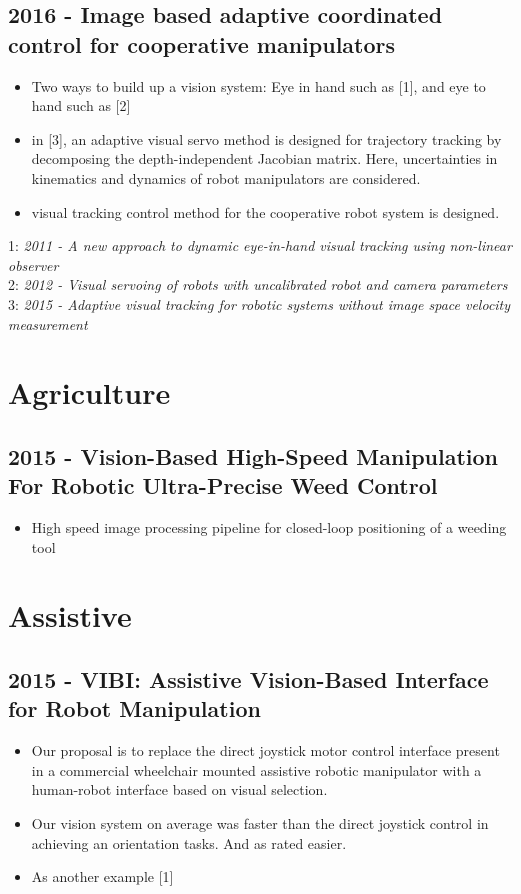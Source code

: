 \subsection{2016 - Image based adaptive coordinated control for cooperative manipulators}
\begin{itemize}
\item Two ways to build up a vision system: Eye in hand such as [1], and eye to hand such as [2]
\item in [3], an adaptive visual servo method is designed for trajectory tracking by decomposing the depth-independent Jacobian matrix. Here, uncertainties in kinematics and dynamics of robot manipulators are considered. 
\item visual tracking control method for the cooperative robot system is designed. 
\end{itemize}
1: \textit{2011 - A new approach to dynamic eye-in-hand visual tracking using non-linear observer} \\
2: \textit{2012 - Visual servoing of robots with uncalibrated robot and camera parameters} \\
3: \textit{2015 - Adaptive visual tracking for robotic systems without image space velocity measurement}

\vspace{3cm}

\section{Agriculture}
\subsection{2015 - Vision-Based High-Speed Manipulation For Robotic Ultra-Precise Weed Control}
\begin{itemize}
\item High speed image processing pipeline for closed-loop positioning of a weeding tool
\end{itemize}

\vspace{3cm}

\section{Assistive}
\subsection{2015 - VIBI: Assistive Vision-Based Interface for Robot Manipulation}
\begin{itemize}
\item Our proposal is to replace the direct joystick motor control interface present in a commercial wheelchair mounted assistive robotic manipulator with a human-robot interface based on visual selection.
\item  Our vision system on average was faster
than the direct joystick control in achieving an orientation
tasks. And as rated  easier. 
\item As another example [1]
\end{itemize}

